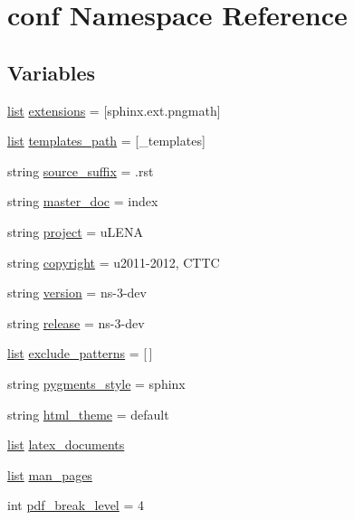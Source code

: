 \hypertarget{namespaceconf}{}\section{conf Namespace Reference}
\label{namespaceconf}
\subsection*{Variables}
\begin{DoxyCompactItemize}
\item 
\hyperlink{openflow-interface_8h_afd9bcfa176617760671b67580f536fa7}{list} \hyperlink{namespaceconf_a540efa67c53e84c1c353c1df2e37e39c}{extensions} = \mbox{[}\textquotesingle{}sphinx.\+ext.\+pngmath\textquotesingle{}\mbox{]}
\item 
\hyperlink{openflow-interface_8h_afd9bcfa176617760671b67580f536fa7}{list} \hyperlink{namespaceconf_af50129dcc1f90655539f025595a3093b}{templates\+\_\+path} = \mbox{[}\textquotesingle{}\+\_\+templates\textquotesingle{}\mbox{]}
\item 
string \hyperlink{namespaceconf_a1e0ba7f4cb1d50fa831f1236a77d60f6}{source\+\_\+suffix} = \textquotesingle{}.rst\textquotesingle{}
\item 
string \hyperlink{namespaceconf_ae22a29d94a222730836db739d6dbd71e}{master\+\_\+doc} = \textquotesingle{}index\textquotesingle{}
\item 
string \hyperlink{namespaceconf_aa2c6aefbed1597a70cfb45a760e5977c}{project} = u\textquotesingle{}L\+E\+NA\textquotesingle{}
\item 
string \hyperlink{namespaceconf_ac8ccf456b321bc9052c0691a173b6925}{copyright} = u\textquotesingle{}2011-\/2012, C\+T\+TC\textquotesingle{}
\item 
string \hyperlink{namespaceconf_a93370314d5e59e93dabf67ca4906c634}{version} = \textquotesingle{}ns-\/3-\/dev\textquotesingle{}
\item 
string \hyperlink{namespaceconf_a90a599726178800ad5a42f6bc2cd5208}{release} = \textquotesingle{}ns-\/3-\/dev\textquotesingle{}
\item 
\hyperlink{openflow-interface_8h_afd9bcfa176617760671b67580f536fa7}{list} \hyperlink{namespaceconf_aa01918cfe75aed3ae059dd96c71c8f08}{exclude\+\_\+patterns} = \mbox{[}$\,$\mbox{]}
\item 
string \hyperlink{namespaceconf_afa4e4ed164119ef5f4656e9554ed1f1b}{pygments\+\_\+style} = \textquotesingle{}sphinx\textquotesingle{}
\item 
string \hyperlink{namespaceconf_a7f1b143ff25817758abd21a7db110510}{html\+\_\+theme} = \textquotesingle{}default\textquotesingle{}
\item 
\hyperlink{openflow-interface_8h_afd9bcfa176617760671b67580f536fa7}{list} \hyperlink{namespaceconf_a00b7896473527f894006130b1113cb4b}{latex\+\_\+documents}
\item 
\hyperlink{openflow-interface_8h_afd9bcfa176617760671b67580f536fa7}{list} \hyperlink{namespaceconf_a45cae4ca704c12a150b112eb1b66d0b1}{man\+\_\+pages}
\item 
int \hyperlink{namespaceconf_a5f25cec5a72d1111f56f5a416be2a8d1}{pdf\+\_\+break\+\_\+level} = 4
\end{DoxyCompactItemize}


